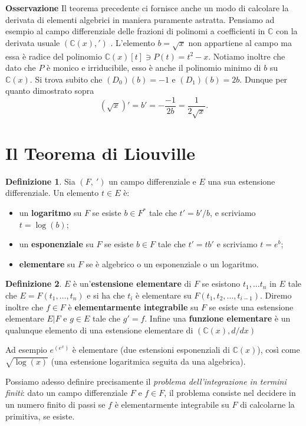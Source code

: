 \documentclass[10pt,oneside]{article}
\theoremstyle{definition}
\theoremstyle{plain}
\theoremstyle{definition}
\newtheorem{dfn}{Definizione}
\theoremstyle{plain}
\theoremstyle{plain}
\newcommand{\C}{\mathbb{C}}
\begin{document}
\textbf{Osservazione}
Il teorema precedente ci fornisce anche un modo di calcolare la derivata di elementi algebrici in maniera puramente astratta. Pensiamo ad esempio al campo differenziale delle frazioni di polinomi a coefficienti in $\C$ con la derivata usuale $(\C(x),')$ . L'elemento $b=\sqrt{x}$ non appartiene al campo ma essa è radice del polinomio $\C(x)[t]\ni P(t) = t^2-x$. Notiamo inoltre che dato che $P$ è monico e irriducibile, esso è anche il polinomio minimo di $b$ su $\C(x)$. Si trova subito che $(D_0)(b)=-1$ e $(D_1)(b)=2b$. Dunque per quanto dimostrato sopra 
\[(\sqrt{x})'=b'=-\frac{-1}{2b}= \frac{1}{2\sqrt{x}}. \]


\section{Il Teorema di Liouville}
\begin{dfn}
Sia $(F, \ ')$ un campo differenziale e $E$ una sua estensione differenziale. Un elemento  $t \in E$ è: 
\begin{itemize}
\item un \textbf{logaritmo} su $F$ se esiste $b \in F^*$ tale che $t'=b'/b$, e scriviamo $t=\log(b)$;
\item un \textbf{esponenziale} su $F$ se esiste $b \in F$ tale che $t'=tb'$ e scriviamo $t=e^b$;
\item \textbf{elementare } su $F$ se è algebrico o un esponenziale o un logaritmo.
\end{itemize}

\end{dfn}

\begin{dfn}\label{def:el}
$E$ è un'\textbf{estensione elementare} di $F$ se esistono $t_1, \dots t_n$ in $E$ tale che $E=F(t_1,\dots, t_n)$ e si ha che $t_i$ è elementare su $F(t_1,t_2,\dots, t_{i-1})$. Diremo inoltre che $f \in F$ è \textbf{elementarmente integrabile } su $F$ se esiste una estensione elementare $E|F$ e $g \in E$ tale che $g'=f$. Infine una \textbf{funzione elementare }è un qualunque elemento di una estensione elementare di $( \C(x), d/dx)$ 
\end{dfn}

Ad esempio $e^{(e^x)}$ è elementare (due estensioni esponenziali di $\C(x)$), così come $\sqrt{\log(x)}$ (una estensione logaritmica seguita da una algebrica).

Possiamo adesso definire precisamente il \textit{problema dell'integrazione in termini finiti}: dato un campo differenziale $F$ e $f \in F$, il problema consiste nel decidere in un numero finito di passi se $f$ è elementarmente integrabile su $F$ di calcolarne la primitiva, se esiste.
\bigskip
\end{document}
